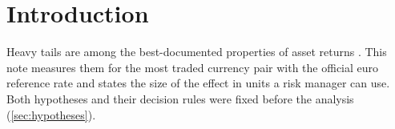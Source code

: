 \section{Introduction}

Heavy tails are among the best-documented properties of asset returns
\parencite{Cont2001EmpiricalProperties}. This note measures them for the most traded
currency pair with the official euro reference rate and states the size of the effect in
units a risk manager can use. Both hypotheses and their decision rules were fixed before
the analysis (\cref{sec:hypotheses}).
